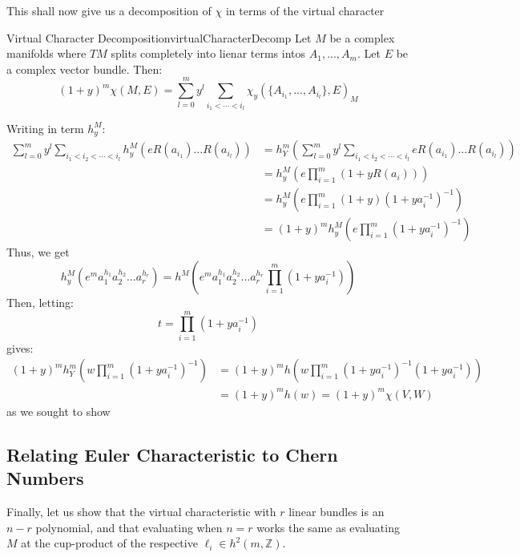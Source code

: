 \documentclass{book}
\newcommand{\Z}{{\mathbb{Z}}}
\begin{document}
This shall now give us a decomposition of $\chi$ in terms of the virtual character

\begin{thm}{Virtual Character Decomposition}{virtualCharacterDecomp}
  Let $M$ be a complex manifolds where $TM$ splits completely into lienar terms intos $A_1, ..., A_m$. Let $E$
  be a complex vector bundle. Then:
  \[
    (1+y)^m \chi(M, E) = \sum_{l=0}^m y^l \sum_{i_1 < \cdots < i_l} \chi_y(\{A_{i_1}, ..., A_{i_l}\}, E)_M
  \]
\end{thm}

\begin{Proof}
    Writing in term $h_y^M$:
  \begin{align*}
      \sum_{l=0}^m y^l \sum_{i_1<i_2<\cdots<i_l} h_y^M(eR(a_{i_1})\ldots R(a_{i_l})) &= h_Y^m\left(\sum_{l=0}^m y^l \sum_{i_1<i_2<\cdots<i_l} eR(a_{i_1})\ldots R(a_{i_l})\right) \\
      &= h_y^M\left(e\prod_{i=1}^m(1+yR(a_i))\right) \\
      &= h_y^M\left(e\prod_{i=1}^m(1+y)(1+ya_i^{-1})^{-1}\right) \\
      &= (1+y)^mh_y^M\left(e\prod_{i=1}^m(1+ya_i^{-1})^{-1}\right)
  \end{align*}
  Thus, we get
  \[
      h_y^M(e^m a_1^{h_1}a_2^{h_2}\ldots a_r^{h_r}) = h^M\left(e^m a_1^{h_1}a_2^{h_2}\ldots a_r^{h_r}\prod_{i=1}^m(1+ya_i^{-1})\right)
  \]
  Then, letting:
  \[
      t = \prod_{i=1}^m(1+ya_i^{-1})
  \]
  gives:
  \begin{align*}
      (1+y)^mh_Y^m\left(w\prod_{i=1}^m(1+ya_i^{-1})^{-1}\right) &= (1+y)^mh\left(w\prod_{i=1}^m(1+ya_i^{-1})^{-1}(1+ya_i^{-1})\right) \\
      &= (1+y)^mh(w) = (1+y)^m\chi(V,W)
  \end{align*}
  as we sought to show
\end{Proof}






\subsection{Relating Euler Characteristic to Chern Numbers}\label{sec:virtualEulerCharOnProjVar}

Finally, let us show that the virtual characteristic with $r$ linear bundles is an $n-r$ polynomial, and that
evaluating when $n=r$ works the same as evaluating $M$ at the cup-product of the respective $\ell_i \in h^2(m
,\Z)$.
\end{document}
